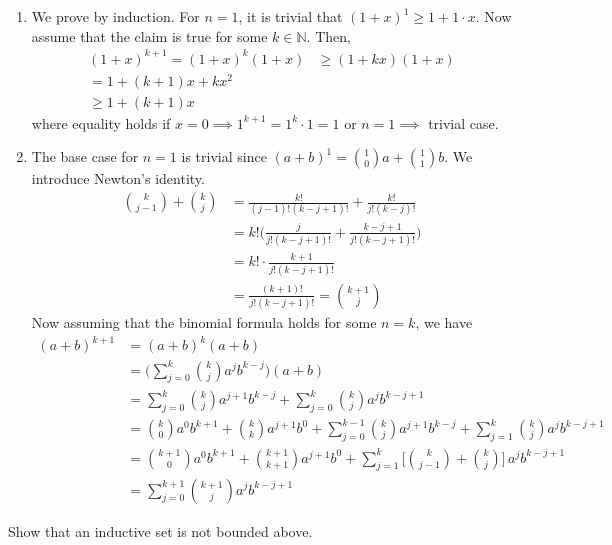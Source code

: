 \documentclass{article}
\begin{document}
\begin{solution}
\begin{enumerate}
        \item We prove by induction. For $n=1$, it is trivial that $(1 + x)^1 \geq 1 + 1 \cdot x$. Now assume that the claim is true for some $k \in \mathbb{N}$. Then, 
        \begin{align*}
            (1 + x)^{k+1} = (1 + x)^k (1 + x) & \geq (1 + k x) (1 + x) \\
            = 1 + (k+1) x + k x^2 \\ 
            \geq 1 + (k+1) x
        \end{align*}
        where equality holds if $x = 0 \implies 1^{k+1} = 1^k \cdot 1 = 1$ or $n=1 \implies $ trivial case. 
        \item The base case for $n=1$ is trivial since $(a + b)^1 = \binom{1}{0} a + \binom{1}{1} b$. We introduce Newton's identity. 
        \begin{align*}
            \binom{k}{j-1} + \binom{k}{j} & = \frac{k!}{(j-1)! (k-j+1)!} + \frac{k!}{j! (k-j)!} \\
            & = k! \bigg( \frac{j}{j! (k-j+1)!} + \frac{k-j+1}{j! (k-j+1)!} \bigg) \\
            & = k! \cdot \frac{k+1}{j! (k-j+1)!} \\
            & = \frac{(k+1)!}{j!(k-j+1)!} = \binom{k+1}{j}
        \end{align*}
        Now assuming that the binomial formula holds for some $n=k$, we have 
        \begin{align*}
            (a + b)^{k+1} & = (a + b)^k (a + b) \\
            & = \bigg( \sum_{j=0}^k \binom{k}{j} a^j b^{k-j} \bigg) (a + b) \\
            & = \sum_{j=0}^k \binom{k}{j} a^{j+1} b^{k-j} + \sum_{j=0}^k \binom{k}{j} a^j b^{k-j + 1} \\
            & = \binom{k}{0} a^0 b^{k+1} + \binom{k}{k} a^{j+1} b^0 + \sum_{j=0}^{k-1} \binom{k}{j} a^{j+1} b^{k-j} + \sum_{j=1}^k \binom{k}{j} a^j b^{k-j+1} \\
            & = \binom{k+1}{0} a^0 b^{k+1} + \binom{k+1}{k+1} a^{j+1} b^0 + \sum_{j=1}^k \bigg[ \binom{k}{j-1} + \binom{k}{j} \bigg] \, a^j b^{k-j + 1} \\
            & = \sum_{j=0}^{k+1} \binom{k+1}{j} a^j b^{k-j+1} 
        \end{align*}
    \end{enumerate}
    \end{solution}

    \begin{exercise}[Zorich 2.2.3]
    Show that an inductive set is not bounded above. 
    \end{exercise}
\end{document}
